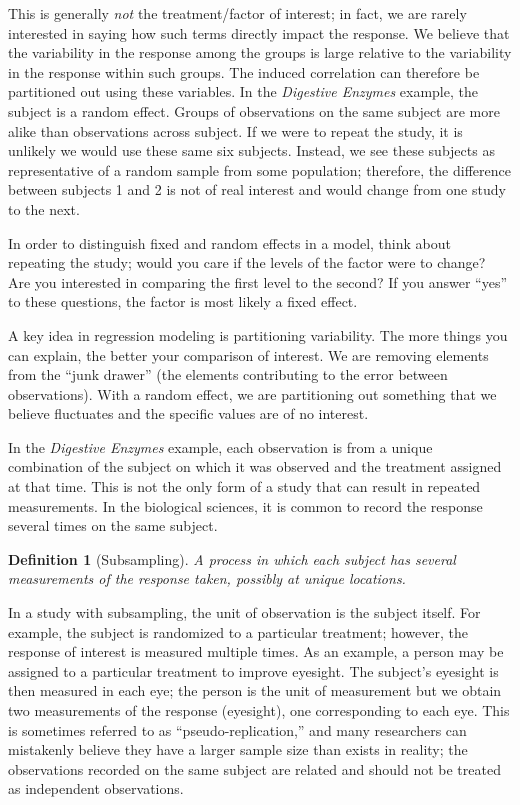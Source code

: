 \documentclass[
]{book}
\theoremstyle{plain}
\theoremstyle{mydefn}
\newtheorem{definition}{Definition}[chapter]
\theoremstyle{myexmpl}
\theoremstyle{remark}
\begin{document}
This is generally \emph{not} the treatment/factor of interest; in fact, we are rarely interested in saying how such terms directly impact the response. We believe that the variability in the response among the groups is large relative to the variability in the response within such groups. The induced correlation can therefore be partitioned out using these variables. In the \emph{Digestive Enzymes} example, the subject is a random effect. Groups of observations on the same subject are more alike than observations across subject. If we were to repeat the study, it is unlikely we would use these same six subjects. Instead, we see these subjects as representative of a random sample from some population; therefore, the difference between subjects 1 and 2 is not of real interest and would change from one study to the next.

\begin{rmdtip}
In order to distinguish fixed and random effects in a model, think about repeating the study; would you care if the levels of the factor were to change? Are you interested in comparing the first level to the second? If you answer ``yes'' to these questions, the factor is most likely a fixed effect.
\end{rmdtip}

A key idea in regression modeling is partitioning variability. The more things you can explain, the better your comparison of interest. We are removing elements from the ``junk drawer'' (the elements contributing to the error between observations). With a random effect, we are partitioning out something that we believe fluctuates and the specific values are of no interest.

In the \emph{Digestive Enzymes} example, each observation is from a unique combination of the subject on which it was observed and the treatment assigned at that time. This is not the only form of a study that can result in repeated measurements. In the biological sciences, it is common to record the response several times on the same subject.

\begin{definition}[Subsampling]
\protect\hypertarget{def:defn-subsampling}{}{\label{def:defn-subsampling} {} }A process in which each subject has several measurements of the response taken, possibly at unique locations.\\
\end{definition}

In a study with subsampling, the unit of observation is the subject itself. For example, the subject is randomized to a particular treatment; however, the response of interest is measured multiple times. As an example, a person may be assigned to a particular treatment to improve eyesight. The subject's eyesight is then measured in each eye; the person is the unit of measurement but we obtain two measurements of the response (eyesight), one corresponding to each eye. This is sometimes referred to as ``pseudo-replication,'' and many researchers can mistakenly believe they have a larger sample size than exists in reality; the observations recorded on the same subject are related and should not be treated as independent observations.
\end{document}

